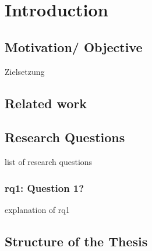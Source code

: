 \chapter{Introduction}\label{ch:introduction}

\section{Motivation/ Objective}\label{sec:motivation}
Zielsetzung


\section{Related work}\label{sec:related-work}


\section{Research Questions}\label{sec:research-questions}

list of research questions
\subsection[\acs{rq}1]{\ac{rq}1: Question 1?}\label{subsec:rq1}
explanation of \ac{rq}1


\section{Structure of the Thesis}\label{sec:structure-of-the-thesis}